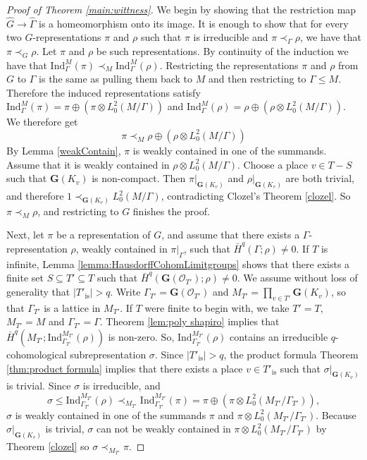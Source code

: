 \documentclass[12pt,reqno]{amsart}
\theoremstyle{definition}
\newcommand{\barH}{\bar{H}}
\newcommand{\abs}[1]{\left| #1 \right|}
\begin{document}
\begin{proof}[Proof of Theorem \ref{main:wittness}]
    We begin by showing that the restriction map $\widehat{G} \to \widehat{\Gamma}$ is a homeomorphism onto its image. It is enough to show that for every two $G$-representations $\pi$ and $\rho$ such that $\pi$ is irreducible and $\pi \prec_{\Gamma} \rho$, we have that $\pi \prec_G \rho$. Let $\pi$ and $\rho$ be such representations. By continuity of the induction we have that $\mathrm{Ind}_\Gamma^M(\pi) \prec_M \mathrm{Ind}_\Gamma^M(\rho)$. Restricting the representations $\pi$ and $\rho$ from $G$ to $\Gamma$ is the same as pulling them back to $M$ and then restricting to $\Gamma \leq M$. Therefore the induced representations satisfy $\mathrm{Ind}_\Gamma^M(\pi)=\pi \oplus (\pi \otimes L^2_0(M/\Gamma))$ and $\mathrm{Ind}_\Gamma^M(\rho)=\rho \oplus (\rho \otimes L^2_0(M/\Gamma))$. We therefore get
    $$\pi \prec_M \rho \oplus (\rho \otimes L^2_0(M/\Gamma))$$
    By Lemma \ref{weakContain}, $\pi$ is weakly contained in one of the summands. Assume that it is weakly contained in $\rho \otimes L^2_0(M/\Gamma)$. Choose a place $v \in T-S$ such that $\mathbf{G}(K_v)$ is non-compact. Then $\pi|_{\mathbf{G}(K_v)}$ and $\rho|_{\mathbf{G}(K_v)}$ are both trivial, and therefore $1 \prec_{\mathbf{G}(K_v)} L^2_0(M/\Gamma)$, contradicting Clozel's Theorem \ref{clozel}. So $\pi \prec_M \rho$, and restricting to $G$ finishes the proof.

    Next, let $\pi$ be a representation of $G$, and assume that there exists a $\Gamma$-representation $\rho$, weakly contained in $\pi|_\Gamma$, such that $\barH^q(\Gamma;\rho) \ne 0$. If $T$ is infinite, Lemma \ref{lemma:HausdorffCohomLimitgroups} shows that there exists a finite set $S\subseteq T' \subseteq T$ such that $\barH^q(\mathbf{G}(\mathcal O_{T'});\rho) \ne 0$. We assume without loss of generality that $\abs{T'_\mathrm{is}} > q$. Write $\Gamma_{T'}=\mathbf{G}(\mathcal O_{T'})$ and $M_{T'}=\prod_{v \in {T'}} \mathbf{G}(K_v)$, so that $\Gamma_{T'}$ is a lattice in $M_{T'}$. If $T$ were finite to begin with, we take $T'=T$, $M_{T'}=M$ and $\Gamma_{T'}=\Gamma$. Theorem \ref{lem:poly shapiro} implies that $\bar{H}^q(M_{T'};\mathrm{Ind}_{\Gamma_{T'}}^{M_{T'}}(\rho))$ is non-zero. So, $\mathrm{Ind}_{\Gamma_{T'}}^{M_{T'}}(\rho)$ contains an irreducible $q$-cohomological subrepresentation $\sigma$. Since $|T'_\mathrm{is}| > q$, the product formula Theorem \ref{thm:product formula} implies that there exists a place $v \in T'_\mathrm{is}$ such that $\sigma|_{\mathbf{G}(K_v)}$ is trivial. Since $\sigma$ is irreducible, and
    $$\sigma \leq \mathrm{Ind}_{\Gamma_{T'}}^{M_{T'}}(\rho) \prec_{M_{T'}} \mathrm{Ind}_{\Gamma_{T'}}^{M_{T'}}(\pi)=\pi \oplus (\pi \otimes L^2_0(M_{T'} / \Gamma_{T'})),$$$\sigma$ is weakly contained in one of the summands $\pi$ and $\pi \otimes L^2_0(M_{T'} / \Gamma_{T'})$. Because $\sigma|_{\mathbf{G}(K_v)}$ is trivial, $\sigma$ can not be weakly contained in $\pi \otimes L^2_0(M_{T'} / \Gamma_{T'})$ by Theorem \ref{clozel} so $\sigma \prec_{M_{T'}} \pi$.


\end{proof}
\end{document}
